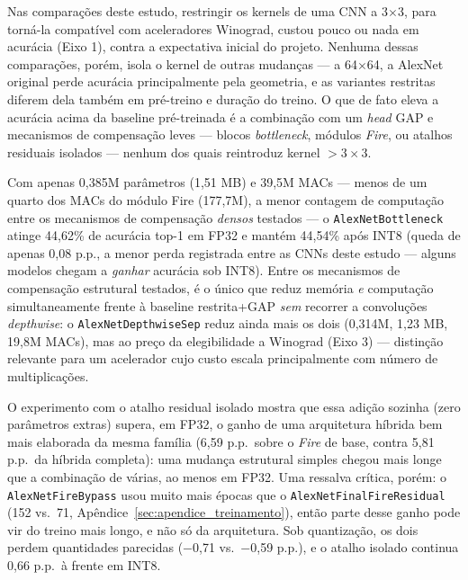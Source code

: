 \documentclass[conference]{IEEEtran}
\begin{document}
Nas comparações deste estudo, restringir os kernels de uma CNN a 3$\times$3, para torná-la
compatível com aceleradores Winograd, custou pouco ou nada em acurácia (Eixo 1), contra a
expectativa inicial do projeto. Nenhuma dessas comparações, porém, isola o kernel de outras mudanças — a 64$\times$64, a AlexNet original
perde acurácia principalmente pela geometria, e as variantes restritas diferem dela também em
pré-treino e duração do treino. O que de fato
eleva a acurácia acima da baseline pré-treinada é a combinação com um \textit{head} GAP e
mecanismos de compensação leves — blocos \textit{bottleneck}, módulos \textit{Fire}, ou atalhos
residuais isolados — nenhum dos quais reintroduz kernel $> 3\times 3$.

Com apenas 0,385M parâmetros (1,51 MB) e 39,5M MACs — menos de um quarto dos MACs do módulo Fire
(177,7M), a menor contagem de computação entre os mecanismos de compensação \emph{densos} testados
— o \texttt{AlexNetBottleneck} atinge 44,62\% de acurácia top-1 em FP32 e mantém 44,54\% após INT8
(queda de apenas 0,08 p.p., a menor perda registrada entre as CNNs deste estudo — alguns modelos
chegam a \emph{ganhar} acurácia sob INT8). Entre os mecanismos de compensação estrutural testados,
é o único que reduz memória \emph{e} computação simultaneamente frente à baseline restrita+GAP
\emph{sem} recorrer a convoluções \textit{depthwise}: o \texttt{AlexNetDepthwiseSep} reduz ainda
mais os dois (0,314M, 1,23 MB, 19,8M MACs), mas ao preço da elegibilidade a Winograd (Eixo 3) —
distinção relevante para um acelerador cujo custo escala principalmente com número de multiplicações.

O experimento com o atalho residual isolado mostra que essa adição sozinha (zero parâmetros
extras) supera, em FP32, o ganho de uma arquitetura híbrida bem mais elaborada da mesma família
(6,59 p.p.\ sobre o \textit{Fire} de base, contra 5,81 p.p.\ da híbrida completa): uma mudança
estrutural simples chegou mais longe que a combinação de várias, ao menos em FP32. Uma ressalva
crítica, porém: o \texttt{AlexNetFireBypass} usou muito mais épocas que o
\texttt{AlexNetFinalFireResidual} (152 vs.\ 71, Apêndice~\ref{sec:apendice_treinamento}), então
parte desse ganho pode vir do treino mais longo, e não só da arquitetura. Sob quantização, os dois
perdem quantidades parecidas ($-$0,71 vs.\ $-$0,59 p.p.), e o atalho isolado continua 0,66 p.p.\ à
frente em INT8.
\end{document}
